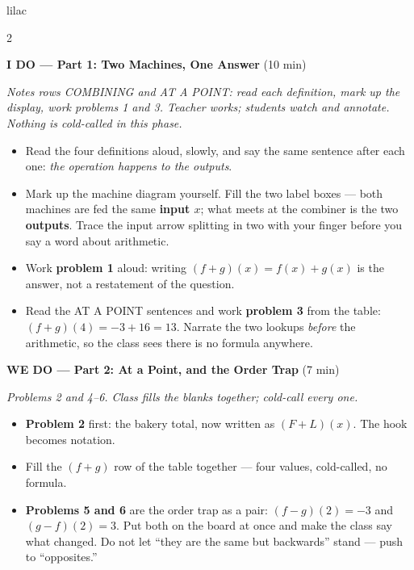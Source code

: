\documentclass[10pt]{article}
\begin{document}
\begin{skillbox}{lilac}
\begin{multicols}{2}

\textbf{I DO --- Part 1: Two Machines, One Answer} (10 min)

\textit{Notes rows COMBINING and AT A POINT: read each definition, mark up the
display, work problems 1 and 3. Teacher works; students watch and annotate.
Nothing is cold-called in this phase.}
\begin{itemize}
  \item Read the four definitions aloud, slowly, and say the same sentence after
        each one: \textit{the operation happens to the outputs}.
  \item Mark up the machine diagram yourself. Fill the two label boxes --- both
        machines are fed the same \textbf{input $x$}; what meets at the combiner
        is the two \textbf{outputs}. Trace the input arrow splitting in two with
        your finger before you say a word about arithmetic.
  \item Work \textbf{problem 1} aloud: writing $(f+g)(x) = f(x) + g(x)$ is the
        answer, not a restatement of the question.
  \item Read the AT A POINT sentences and work \textbf{problem 3} from the table:
        $(f+g)(4) = -3 + 16 = 13$. Narrate the two lookups \textit{before} the
        arithmetic, so the class sees there is no formula anywhere.
\end{itemize}

\textbf{WE DO --- Part 2: At a Point, and the Order Trap} (7 min)

\textit{Problems 2 and 4--6. Class fills the blanks together; cold-call every
one.}
\begin{itemize}
  \item \textbf{Problem 2} first: the bakery total, now written as $(F+L)(x)$.
        The hook becomes notation.
  \item Fill the $(f+g)$ row of the table together --- four values, cold-called,
        no formula.
  \item \textbf{Problems 5 and 6} are the order trap as a pair: $(f-g)(2) = -3$
        and $(g-f)(2) = 3$. Put both on the board at once and make the class say
        what changed. Do not let ``they are the same but backwards'' stand ---
        push to ``opposites.''
\end{itemize}

\columnbreak


\end{multicols}
\end{skillbox}
\end{document}
